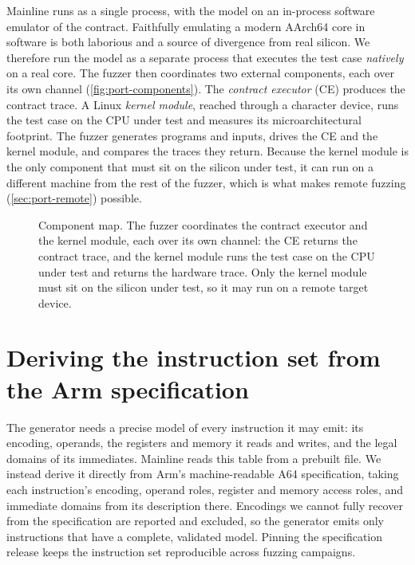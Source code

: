 Mainline \revizor{} runs as a single process, with the model on an in-process software
emulator of the contract. Faithfully emulating a modern AArch64 core in software is both
laborious and a source of divergence from real silicon. We therefore run the model as a
separate process that executes the test case \emph{natively} on a real core. The fuzzer then
coordinates two external components, each over its own channel (\autoref{fig:port-components}).
The \emph{contract executor}
(CE) produces the contract trace. A Linux \emph{kernel module}, reached through a
 character device, runs the test case on the CPU under test and measures
its microarchitectural footprint. The fuzzer generates programs and inputs, drives the CE
and the kernel module, and compares the traces they return. Because the kernel module is the
only component that must sit on the silicon under test, it can run on a different machine
from the rest of the fuzzer, which is what makes remote fuzzing (\autoref{sec:port-remote})
possible.

\begin{figure}[t]
\centering
\fitwidth{}
\caption{Component map. The fuzzer coordinates the contract executor and the kernel module,
each over its own channel: the CE returns the contract trace, and the kernel module runs the
test case on the CPU under test and returns the hardware trace. Only the kernel module must
sit on the silicon under test, so it may run on a remote target device.}
\label{fig:port-components}
\end{figure}

\section{Deriving the instruction set from the Arm specification}
\label{sec:port-isa}

The generator needs a precise model of every instruction it may emit: its encoding,
operands, the registers and memory it reads and writes, and the legal domains of its
immediates. Mainline \revizor{} reads this table from a prebuilt file. We instead derive it
directly from Arm's machine-readable A64 specification, taking each instruction's encoding,
operand roles, register and memory access roles, and immediate domains from its description
there. Encodings we cannot fully recover from the
specification are reported and excluded, so the generator emits only
instructions that have a complete, validated model. Pinning the specification release keeps
the instruction set reproducible across fuzzing campaigns.

